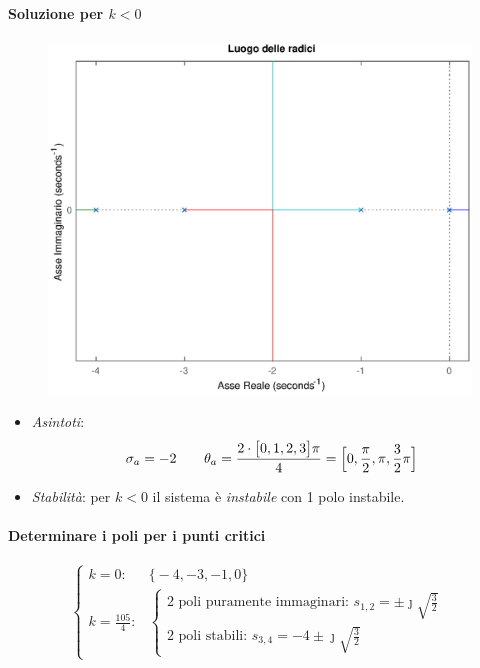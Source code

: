 \paragraph{Soluzione per \(k < 0\)}

\begin{figure}[ht]
	\centering
	\includegraphics[scale=.6]{mod1/assets/rl_ex38n}
\end{figure}

\begin{itemize}
	\item \emph{Asintoti}:
		\[
			\sigma_a = -2 \qquad \theta_a = \frac{2\cdot\bigl[ 0,1,2,3 \bigr]\pi}{4} = \Bigl[ 0,\frac{\pi}{2},\pi,\frac{3}{2}\pi \Bigr]
		\]
	\item \emph{Stabilità}: per \(k < 0\) il sistema è \emph{instabile} con 1 polo instabile.
\end{itemize}

\paragraph{Determinare i poli per i punti critici}
\[\begin{cases}
	k = 0\colon & \bigl\{ -4,-3,-1,0 \bigr\} \\
	k = \frac{105}{4}\colon & \begin{cases}
		\text{2 poli puramente immaginari: } s_{1,2} = \pm\jmath\sqrt{\frac{3}{2}} \\
		\text{2 poli stabili: } s_{3,4} = -4 \pm\jmath\sqrt{\frac{3}{2}}
	\end{cases}
\end{cases}\]


